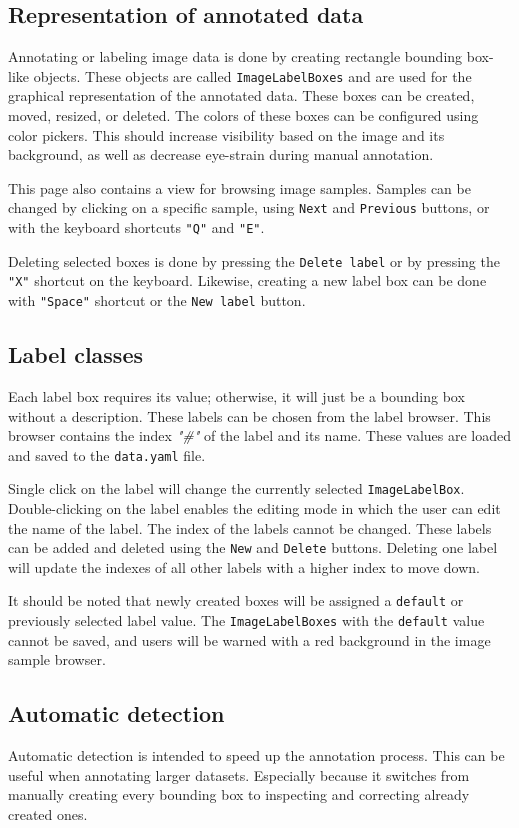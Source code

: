 \subsection{Representation of annotated data}
Annotating or labeling image data is done by creating rectangle bounding box-like objects. These objects are called \texttt{ImageLabelBoxes} and are used for the graphical representation of the annotated data. These boxes can be created, moved, resized, or deleted. The colors of these boxes can be configured using color pickers. This should increase visibility based on the image and its background, as well as decrease eye-strain during manual annotation.

This page also contains a view for browsing image samples. Samples can be changed by clicking on a specific sample, using \texttt{Next} and \texttt{Previous} buttons, or with the keyboard shortcuts \texttt{"Q"} and \texttt{"E"}.

Deleting selected boxes is done by pressing the \texttt{Delete label} or by pressing the \texttt{"X"} shortcut on the keyboard. Likewise, creating a new label box can be done with \texttt{"Space"} shortcut or the \texttt{New label} button. 

\subsection{Label classes}
Each label box requires its value; otherwise, it will just be a bounding box without a description. These labels can be chosen from the label browser. This browser contains the index \textit{"\#"} of the label and its name. These values are loaded and saved to the \texttt{data.yaml} file. 

Single click on the label will change the currently selected \texttt{ImageLabelBox}. Double-clicking on the label enables the editing mode in which the user can edit the name of the label. The index of the labels cannot be changed. These labels can be added and deleted using the \texttt{New} and \texttt{Delete} buttons. Deleting one label will update the indexes of all other labels with a higher index to move down.

It should be noted that newly created boxes will be assigned a \texttt{default} or previously selected label value. The \texttt{ImageLabelBoxes} with the \texttt{default} value cannot be saved, and users will be warned with a red background in the image sample browser. 

\subsection{Automatic detection}
Automatic detection is intended to speed up the annotation process. This can be useful when annotating larger datasets. Especially because it switches from manually creating every bounding box to inspecting and correcting already created ones.

